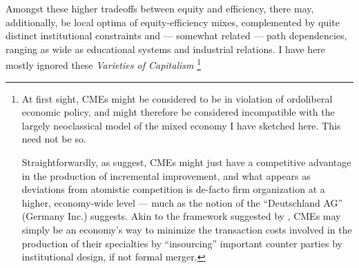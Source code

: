 \documentclass[11pt,a4paper,oneside,openright]{article}
\begin{document}
\begin{enumerate}
	Amongst these higher tradeoffs between equity and efficiency, there may, additionally, be local optima of equity-efficiency mixes, complemented by quite distinct institutional constraints and --- somewhat related --- path dependencies, ranging as wide as educational systems and industrial relations. 
	I have here mostly ignored these \emph{Varieties of Capitalism} \citep{HallSoskice-2001-aa}
	\footnote{
		At first sight, \glspl{CME} might be considered to be in violation of ordoliberal economic policy, and might therefore be considered incompatible with the largely neoclassical model of the mixed economy I have sketched here. 
		This need not be so. 
		
		Straightforwardly, as \citeauthor{HallSoskice-2001-aa} suggest, \glspl{CME} might just have a competitive advantage in the production of incremental improvement, and what appears as deviations from atomistic competition is de-facto firm organization at a higher, economy-wide level --- much as the notion of the ``Deutschland AG'' (Germany Inc.) suggests. 
		Akin to the framework suggested by \cite{Hart1990}, \glspl{CME} may simply be an economy's way to minimize the transaction costs involved in the production of their specialties by ``insourcing'' important counter parties by institutional design, if not formal merger. 
		
}
\end{enumerate}
\end{document}
